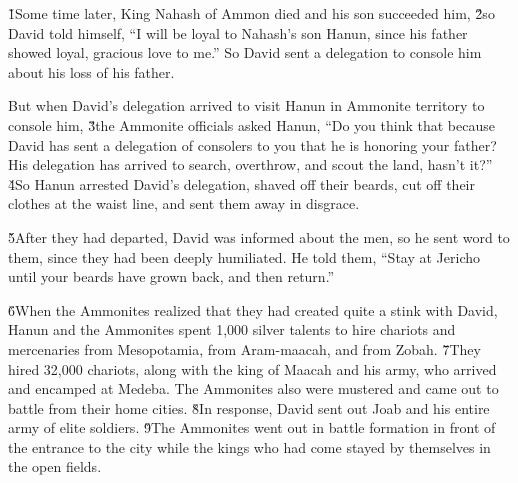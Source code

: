 \v{1}Some time later, King Nahash of Ammon died and his son succeeded him, \v{2}so David told himself, ``I will be loyal to Nahash's son Hanun, since his father showed loyal, gracious love to me.'' So David sent a delegation to console him about his loss of his father.

But when David's delegation arrived to visit Hanun in Ammonite territory to console him, \v{3}the Ammonite officials asked Hanun, ``Do you think that because David has sent a delegation of consolers to you that he is honoring your father? His delegation has arrived to search, overthrow, and scout the land, hasn't it?'' \v{4}So Hanun arrested David's delegation, shaved off their beards, cut off their clothes at the waist line, and sent them away in disgrace.

\v{5}After they had departed, David was informed about the men, so he sent word to them, since they had been deeply humiliated. He told them, ``Stay at Jericho until your beards have grown back, and then return.''

\v{6}When the Ammonites realized that they had created quite a stink with David, Hanun and the Ammonites spent 1,000 silver talents to hire chariots and mercenaries from Mesopotamia, from Aram-maacah, and from Zobah. \v{7}They hired 32,000 chariots, along with the king of Maacah and his army, who arrived and encamped at Medeba. The Ammonites also were mustered and came out to battle from their home cities. \v{8}In response, David sent out Joab and his entire army of elite soldiers. \v{9}The Ammonites went out in battle formation in front of the entrance to the city while the kings who had come stayed by themselves in the open fields.

